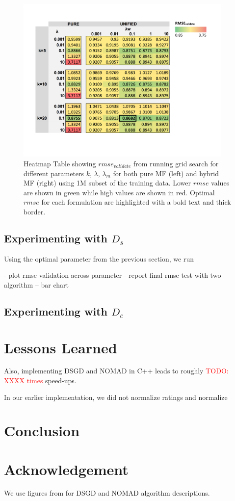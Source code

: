 \documentclass{article} %
\newcommand{\todo}[1]{\textcolor{red}{TODO: #1}}
\begin{document}
\begin{figure}[h]
\centering
\includegraphics[width=4.2in]{figures/grid}
\caption{\label{fig:gridsearch} Heatmap Table showing $rmse_{validate}$ from
running grid search for different parameters $k$, $\lambda$, $\lambda_m$ for
both pure MF (left) and hybrid MF (right) using 1M subset of the training data.  Lower $rmse$
values are shown in green while high values are shown in red.  Optimal $rmse$
for each formulation are highlighted with a bold text and thick border.}
\end{figure}

\subsection{Experimenting with $D_s$}

Using the optimal parameter from the previous section,
we run

- plot rmse validation across parameter
- report final rmse test with two algorithm -- bar chart

\subsection{Experimenting with $D_{c}$}



\section{Lessons Learned}

Also, implementing DSGD and NOMAD in C++ leads to roughly \todo{XXXX times} speed-ups.

In our earlier implementation, we did not normalize ratings and normalize

\section{Conclusion}

\section{Acknowledgement}
We use figures from \cite{yun2013nomad} for DSGD and NOMAD algorithm descriptions.


{}
\end{document}
